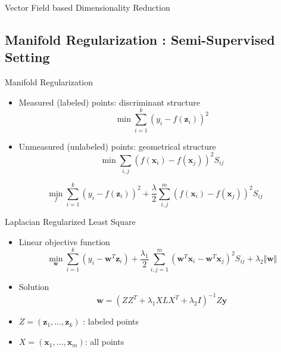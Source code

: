 \documentclass{beamer}
\newcommand{\bol}[1]{\textbf{#1}}
\begin{document}
\begin{darkframes}
\begin{frame}{Vector Field based Dimensionality Reduction}
	\end{frame}      
   
   \subsection{Manifold Regularization : Semi-Supervised Setting}
   \begin{frame}{Manifold Regularization}
   \begin{itemize}
   	\item \alert{Measured (labeled)} points: discriminant structure\\
   	\begin{displaymath}
   		\min\sum_{i = 1}^k\left(y_i - f(\bol{z}_i)\right)^2
   	\end{displaymath}
	\item \alert{Unmeasured (unlabeled)} points: geometrical structure\\
	\begin{displaymath}
		\min\sum_{i,j}\left(f(\bol{x}_i) - f(\bol{x}_j)\right)^2S_{ij}
	\end{displaymath}
   \end{itemize}
   \begin{displaymath}
   		\min_f\sum_{i = 1}^k\left(y_i - f(\bol{z}_i)\right)^2 + \frac{\lambda}{2}\sum_{i,j}^m\left(f(\bol{x}_i) - f(\bol{x}_j)\right)^2S_{ij}
   \end{displaymath}
   \end{frame}
   
  \begin{frame}{Laplacian Regularized Least Square}
  \begin{itemize}
  \item Linear objective function
  \begin{displaymath}
  	\min_{\bol{w}}\sum_{i=1}^k\left( y_i - \bol{w}^T\bol{z}_i \right) + \frac{\lambda_1}{2}\sum_{i,j=1}^m\left(  \bol{w}^T\bol{x}_i - \bol{w}^T\bol{x}_j  \right)^2S_{ij} + \lambda_2\Vert\bol{w}\Vert
  \end{displaymath}
  \item Solution
  \begin{displaymath}
  	\bol{w} = \left(  ZZ^T + \lambda_1XLX^T + \lambda_2I  \right)^{-1}Z\bol{y}
  \end{displaymath}
  \item $Z=(\bol{z}_1,\ldots,\bol{z}_k)$ : labeled points
  \item $X=(\bol{x}_1, \ldots, \bol{x}_m)$: all points
  \end{itemize}
  
  \end{frame}
    
    \end{darkframes}
\end{document}
